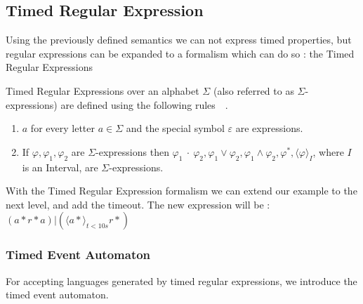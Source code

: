 				

			
		\subsection{Timed Regular Expression}
		
			Using the previously defined semantics we can not express timed properties,
			but regular expressions can be expanded to a formalism which can do so : 
			the Timed Regular Expressions
			

			\begin{dfn}
				\label{dfn:cep:tre}
				Timed Regular Expressions over an alphabet $\Sigma$ (also referred to as $\Sigma$-expressions)
				are defined using the following rules~\citep{tre}~.
				\begin{enumerate}
					\item \underline{$a$} for every letter $a \in \Sigma$ and the special symbol $\varepsilon$ are expressions.
					\item If $\varphi, \varphi_1, \varphi_2$ are $\Sigma$-expressions then %
						$ %
						\varphi_1~\cdot~\varphi_2,
						\varphi_1 \vee \varphi_2,
						\varphi_1 \wedge \varphi_2,
						\varphi^\ast,
						\langle \varphi \rangle_I$, 
						where $I$ is an Interval, are $\Sigma$-expressions.
				\end{enumerate}
			\end{dfn}
			
			With the Timed Regular Expression formalism we can extend our example to the next level, and add the timeout.
			The new expression will be : $(a\ast r\ast a)|( \langle a \ast \rangle_{t < 10 s} r \ast)$
			
			\subsubsection{Timed Event Automaton}
				For accepting languages generated by timed regular expressions, we introduce the timed event automaton.
				
